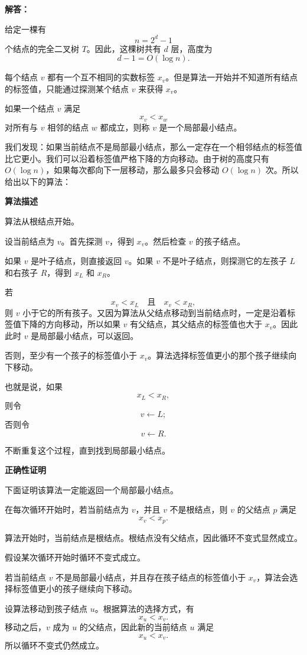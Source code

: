\documentclass[12pt,a4paper]{article}
\begin{document}
\begin{answerbox}
\textbf{解答：}

给定一棵有
\[
n = 2^d - 1
\]
个结点的完全二叉树 $T$。因此，这棵树共有 $d$ 层，高度为
\[
d-1 = O(\log n).
\]

每个结点 $v$ 都有一个互不相同的实数标签 $x_v$。但是算法一开始并不知道所有结点的标签值，只能通过探测某个结点 $v$ 来获得 $x_v$。

如果一个结点 $v$ 满足
\[
x_v < x_w
\]
对所有与 $v$ 相邻的结点 $w$ 都成立，则称 $v$ 是一个局部最小结点。


我们发现：如果当前结点不是局部最小结点，那么一定存在一个相邻结点的标签值比它更小。我们可以沿着标签值严格下降的方向移动。由于树的高度只有 $O(\log n)$，如果每次都向下一层移动，那么最多只会移动 $O(\log n)$ 次。所以给出以下的算法：

\textbf{算法描述}

算法从根结点开始。

设当前结点为 $v$。首先探测 $v$，得到 $x_v$。然后检查 $v$ 的孩子结点。

如果 $v$ 是叶子结点，则直接返回 $v$。如果 $v$ 不是叶子结点，则探测它的左孩子 $L$ 和右孩子 $R$，得到 $x_L$ 和 $x_R$。

若
\[
x_v < x_L
\quad \text{且} \quad
x_v < x_R,
\]
则 $v$ 小于它的所有孩子。又因为算法从父结点移动到当前结点时，一定是沿着标签值下降的方向移动，所以如果 $v$ 有父结点，其父结点的标签值也大于 $x_v$。因此此时 $v$ 是局部最小结点，可以返回。

否则，至少有一个孩子的标签值小于 $x_v$。算法选择标签值更小的那个孩子继续向下移动。

也就是说，如果
\[
x_L < x_R,
\]
则令
\[
v \gets L;
\]
否则令
\[
v \gets R.
\]

不断重复这个过程，直到找到局部最小结点。

\textbf{正确性证明}

下面证明该算法一定能返回一个局部最小结点。

在每次循环开始时，若当前结点为 $v$，并且 $v$ 不是根结点，则 $v$ 的父结点 $p$ 满足
\[
x_v < x_p.
\]

算法开始时，当前结点是根结点。根结点没有父结点，因此循环不变式显然成立。

假设某次循环开始时循环不变式成立。

若当前结点 $v$ 不是局部最小结点，并且存在孩子结点的标签值小于 $x_v$，算法会选择标签值更小的孩子继续向下移动。

设算法移动到孩子结点 $u$。根据算法的选择方式，有
\[
x_u < x_v.
\]
移动之后，$v$ 成为 $u$ 的父结点，因此新的当前结点 $u$ 满足
\[
x_u < x_v.
\]
所以循环不变式仍然成立。


\end{answerbox}
\end{document}
